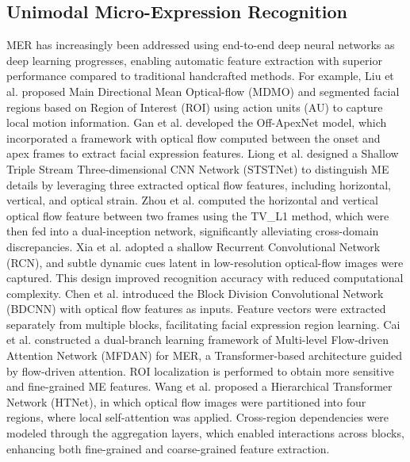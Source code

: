 \documentclass[lettersize,journal]{IEEEtran}
\begin{document}
\subsection{Unimodal Micro-Expression Recognition}
MER has increasingly been addressed using end-to-end deep neural networks as deep learning progresses, enabling automatic feature extraction with superior performance compared to traditional handcrafted methods. For example, Liu et al.\cite{16} proposed Main Directional Mean Optical-flow (MDMO) and segmented facial regions based on Region of Interest (ROI) using action units (AU) to capture local motion information. Gan et al.\cite{17} developed the Off-ApexNet model, which incorporated a framework with optical flow computed between the onset and apex frames to extract facial expression features. Liong et al.\cite{18} designed a Shallow Triple Stream Three-dimensional CNN Network (STSTNet) to distinguish ME details by leveraging three extracted optical flow features, including horizontal, vertical, and optical strain. Zhou et al.\cite{19} computed the horizontal and vertical optical flow feature between two frames using the TV\_L1 method, which were then fed into a dual-inception network, significantly alleviating cross-domain discrepancies. Xia et al.\cite{20} adopted a shallow Recurrent Convolutional Network (RCN), and subtle dynamic cues latent in low-resolution optical-flow images were captured. This design improved recognition accuracy with reduced computational complexity. Chen et al.\cite{21} introduced the Block Division Convolutional Network (BDCNN) with optical flow features as inputs. Feature vectors were extracted separately from multiple blocks, facilitating facial expression region learning. Cai et al.\cite{22} constructed a dual-branch learning framework of Multi-level Flow-driven Attention Network (MFDAN) for MER, a Transformer-based architecture guided by flow-driven attention. ROI localization is performed to obtain more sensitive and fine-grained ME features. Wang et al.\cite{23} proposed a Hierarchical Transformer Network (HTNet), in which optical flow images were partitioned into four regions, where local self-attention was applied. Cross-region dependencies were modeled through the aggregation layers, which enabled interactions across blocks, enhancing both fine-grained and coarse-grained feature extraction.
\end{document}
